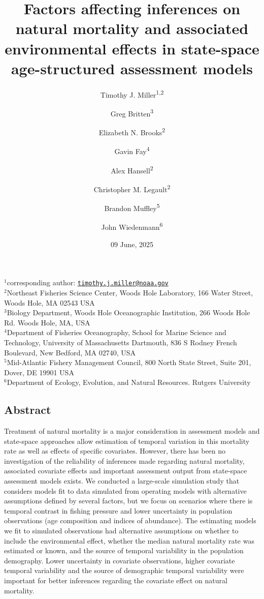 \documentclass[
  12pt,
]{article}
\title{Factors affecting inferences on natural mortality and associated environmental effects in state-space age-structured assessment models}
\author{Timothy J. Miller\textsuperscript{1,2} \and Greg Britten\textsuperscript{3} \and Elizabeth N. Brooks\textsuperscript{2} \and Gavin Fay\textsuperscript{4} \and Alex Hansell\textsuperscript{2} \and Christopher M. Legault\textsuperscript{2} \and Brandon Muffley\textsuperscript{5} \and John Wiedenmann\textsuperscript{6}}
\date{09 June, 2025}
\begin{document}
\maketitle

\(^1\)corresponding author: \href{mailto:timothy.j.miller@noaa.gov}{\nolinkurl{timothy.j.miller@noaa.gov}}\\
\(^2\)Northeast Fisheries Science Center, Woods Hole Laboratory, 166 Water Street, Woods Hole, MA 02543 USA\\
\(^3\)Biology Department, Woods Hole Oceanographic Institution, 266 Woods Hole Rd. Woods Hole, MA, USA\\
\(^4\)Department of Fisheries Oceanography, School for Marine Science and Technology, University of Massachusetts Dartmouth, 836 S Rodney French Boulevard, New Bedford, MA 02740, USA\\
\(^5\)Mid-Atlantic Fishery Management Council, 800 North State Street, Suite 201, Dover, DE 19901 USA\\
\(^6\)Department of Ecology, Evolution, and Natural Resources. Rutgers University\\

\pagebreak

\hypertarget{abstract}{%
\subsection*{Abstract}\label{abstract}}

Treatment of natural mortality is a major consideration in assessment models and state-space approaches allow estimation of temporal variation in this mortality rate as well as effects of specific covariates. However, there has been no investigation of the reliability of inferences made regarding natural mortality, associated covariate effects and important assessment output from state-space assessment models exists. We conducted a large-scale simulation study that considers models fit to data simulated from operating models with alternative assumptions defined by several factors, but we focus on scenarios where there is temporal contrast in fishing pressure and lower uncertainty in population observations (age composition and indices of abundance). The estimating models we fit to simulated observations had alternative assumptions on whether to include the environmental effect, whether the median natural mortality rate was estimated or known, and the source of temporal variability in the population demography. Lower uncertainty in covariate observations, higher covariate temporal variability and the source of demographic temporal variability were important for better inferences regarding the covariate effect on natural mortality.
\end{document}
